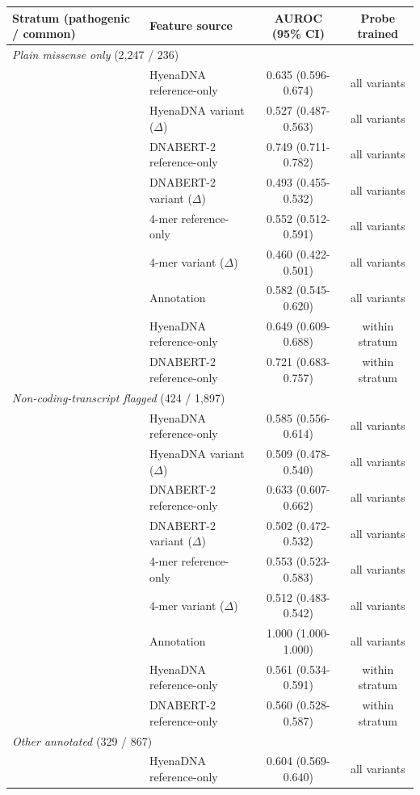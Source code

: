 \begin{tabular}{llcc}\toprule
Stratum (pathogenic / common) & Feature source & AUROC (95\% CI) & Probe trained\\\midrule
\multicolumn{4}{l}{\emph{Plain missense only} (2,247 / 236)}\\
\quad & HyenaDNA reference-only & 0.635 (0.596-0.674) & all variants\\
\quad & HyenaDNA variant ($\Delta$) & 0.527 (0.487-0.563) & all variants\\
\quad & DNABERT-2 reference-only & 0.749 (0.711-0.782) & all variants\\
\quad & DNABERT-2 variant ($\Delta$) & 0.493 (0.455-0.532) & all variants\\
\quad & 4-mer reference-only & 0.552 (0.512-0.591) & all variants\\
\quad & 4-mer variant ($\Delta$) & 0.460 (0.422-0.501) & all variants\\
\quad & Annotation & 0.582 (0.545-0.620) & all variants\\
\quad & HyenaDNA reference-only & 0.649 (0.609-0.688) & within stratum\\
\quad & DNABERT-2 reference-only & 0.721 (0.683-0.757) & within stratum\\
\midrule
\multicolumn{4}{l}{\emph{Non-coding-transcript flagged} (424 / 1,897)}\\
\quad & HyenaDNA reference-only & 0.585 (0.556-0.614) & all variants\\
\quad & HyenaDNA variant ($\Delta$) & 0.509 (0.478-0.540) & all variants\\
\quad & DNABERT-2 reference-only & 0.633 (0.607-0.662) & all variants\\
\quad & DNABERT-2 variant ($\Delta$) & 0.502 (0.472-0.532) & all variants\\
\quad & 4-mer reference-only & 0.553 (0.523-0.583) & all variants\\
\quad & 4-mer variant ($\Delta$) & 0.512 (0.483-0.542) & all variants\\
\quad & Annotation & 1.000 (1.000-1.000) & all variants\\
\quad & HyenaDNA reference-only & 0.561 (0.534-0.591) & within stratum\\
\quad & DNABERT-2 reference-only & 0.560 (0.528-0.587) & within stratum\\
\midrule
\multicolumn{4}{l}{\emph{Other annotated} (329 / 867)}\\
\quad & HyenaDNA reference-only & 0.604 (0.569-0.640) & all variants\\

\end{tabular}
